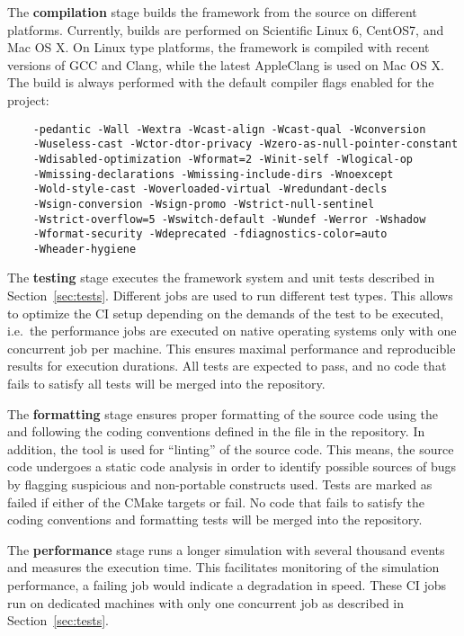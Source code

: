 The \textbf{compilation} stage builds the framework from the source on different platforms.
Currently, builds are performed on Scientific Linux 6, CentOS7, and Mac OS X.
On Linux type platforms, the framework is compiled with recent versions of GCC and Clang, while the latest AppleClang is used on Mac OS X.
The build is always performed with the default compiler flags enabled for the project:
\begin{verbatim}
    -pedantic -Wall -Wextra -Wcast-align -Wcast-qual -Wconversion
    -Wuseless-cast -Wctor-dtor-privacy -Wzero-as-null-pointer-constant
    -Wdisabled-optimization -Wformat=2 -Winit-self -Wlogical-op
    -Wmissing-declarations -Wmissing-include-dirs -Wnoexcept
    -Wold-style-cast -Woverloaded-virtual -Wredundant-decls
    -Wsign-conversion -Wsign-promo -Wstrict-null-sentinel
    -Wstrict-overflow=5 -Wswitch-default -Wundef -Werror -Wshadow
    -Wformat-security -Wdeprecated -fdiagnostics-color=auto
    -Wheader-hygiene
\end{verbatim}

The \textbf{testing} stage executes the framework system and unit tests described in Section~\ref{sec:tests}.
Different jobs are used to run different test types.
This allows to optimize the CI setup depending on the demands of the test to be executed, i.e.\ the performance jobs are executed on native operating systems only with one concurrent job per machine.
This ensures maximal performance and reproducible results for execution durations.
All tests are expected to pass, and no code that fails to satisfy all tests will be merged into the repository.

The \textbf{formatting} stage ensures proper formatting of the source code using the  and following the coding conventions defined in the  file in the repository.
In addition, the  tool is used for ``linting'' of the source code.
This means, the source code undergoes a static code analysis in order to identify possible sources of bugs by flagging suspicious and non-portable constructs used.
Tests are marked as failed if either of the CMake targets  or  fail.
No code that fails to satisfy the coding conventions and formatting tests will be merged into the repository.

The \textbf{performance} stage runs a longer simulation with several thousand events and measures the execution time.
This facilitates monitoring of the simulation performance, a failing job would indicate a degradation in speed.
These CI jobs run on dedicated machines with only one concurrent job as described in Section~\ref{sec:tests}.

